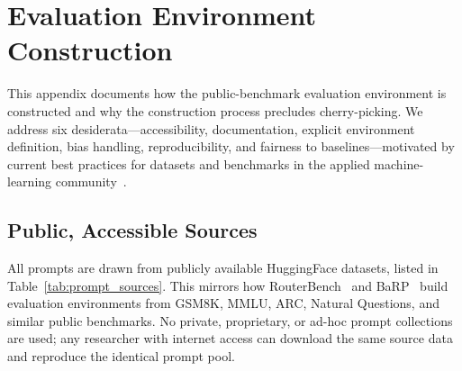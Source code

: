
\section{Evaluation Environment Construction}
\label{app:dataset_construction}

This appendix documents how the public-benchmark evaluation environment is
constructed and why the construction process precludes cherry-picking.
We address six desiderata---accessibility, documentation, explicit environment
definition, bias handling, reproducibility, and fairness to
baselines---motivated by current best practices for datasets and benchmarks
in the applied machine-learning community~\cite{hu2024routerbench,
wang2025barp, li2026llmrouterbench}.

\subsection{Public, Accessible Sources}
\label{app:dataset_sources}

All prompts are drawn from publicly available HuggingFace datasets, listed in
Table~\ref{tab:prompt_sources}.
This mirrors how RouterBench~\cite{hu2024routerbench} and
BaRP~\cite{wang2025barp} build evaluation environments from GSM8K, MMLU, ARC,
Natural Questions, and similar public benchmarks.
No private, proprietary, or ad-hoc prompt collections are used; any
researcher with internet access can download the same source data and
reproduce the identical prompt pool.

